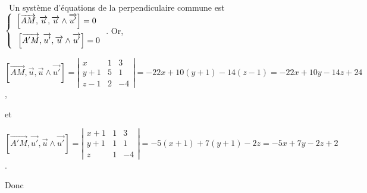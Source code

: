 {{\textbullet~Un système d'équations de la perpendiculaire commune est 
$\left\{
\begin{array}{l}
\left[\overrightarrow{AM},\overrightarrow{u},\overrightarrow{u}\wedge\overrightarrow{u'}\right]=0\\
\rule{0mm}{6mm}\left[\overrightarrow{A'M},\overrightarrow{u'},\overrightarrow{u}\wedge\overrightarrow{u'}\right]=0
\end{array}
\right.$. Or,

\begin{center}
$\left[\overrightarrow{AM},\overrightarrow{u},\overrightarrow{u}\wedge\overrightarrow{u'}\right]=\left|
\begin{array}{ccc}
x&1&3\\
y+1&5&1\\
z-1&2&-4
\end{array}
\right|=-22x+10(y+1)-14(z-1)=-22x+10y-14z+24$,
\end{center}
et

\begin{center}
$\left[\overrightarrow{A'M},\overrightarrow{u'},\overrightarrow{u}\wedge\overrightarrow{u'}\right]=\left|
\begin{array}{ccc}
x+1&1&3\\
y+1&1&1\\
z&1&-4
\end{array}
\right|=-5(x+1)+7(y+1)-2z=-5x+7y-2z+2$.
\end{center}
Donc

\begin{center}
\end{center}}
}